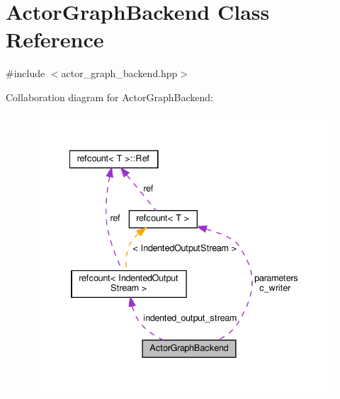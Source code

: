 \hypertarget{classActorGraphBackend}{}\section{Actor\+Graph\+Backend Class Reference}
\label{classActorGraphBackend}


{\ttfamily \#include $<$actor\+\_\+graph\+\_\+backend.\+hpp$>$}



Collaboration diagram for Actor\+Graph\+Backend\+:
\nopagebreak
\begin{figure}[H]
\begin{center}
\leavevmode
\includegraphics[width=335pt]{de/d08/classActorGraphBackend__coll__graph}
\end{center}
\end{figure}
